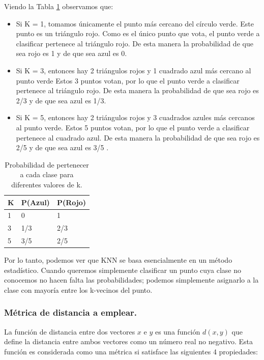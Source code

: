\documentclass[12pt,a4paper]{article}
\begin{document}
\begin{sloppypar}
Viendo la Tabla \ref{table:2} observamos que:

\begin{itemize}
\item Si K = 1, tomamos únicamente el punto más cercano del círculo verde. Este punto es un triángulo rojo. Como es el único punto que vota, el punto verde a clasificar pertenece al triángulo rojo. De esta manera la probabilidad de que sea rojo es 1 y de que sea azul es 0.
\item Si K = 3, entonces hay 2 triángulos rojos y 1 cuadrado azul más cercano al punto verde Estos 3 puntos votan, por lo que el punto verde a clasificar pertenece al triángulo rojo. De esta manera la probabilidad de que sea rojo es 2/3  y de que sea azul es 1/3.
\item Si K = 5, entonces hay 2 triángulos rojos y 3 cuadrados azules más cercanos al punto verde. Estos 5 puntos votan, por lo que el punto verde a clasificar pertenece al cuadrado azul. De esta manera la probabilidad de que sea rojo es 2/5 y de que sea azul es 3/5 .
\end{itemize}

\begin{table}[h!]
\centering
\begin{tabular}{|p{2cm}|p{2cm}|p{2cm}|}
\hline
\textbf{K} & \textbf{P(Azul)} & \textbf{P(Rojo)} \\ [1ex] 
\hline
1 & 0 & 1 \\
\hline
3 & 1/3 & 2/3 \\
\hline
5 & 3/5 & 2/5 \\ [1ex] 
\hline
\end{tabular}
\caption{Probabilidad de pertenecer a cada clase para diferentes valores de k.}
\label{table:2}
\end{table}

Por lo tanto, podemos ver que KNN se basa esencialmente en un método estadístico. Cuando queremos simplemente clasificar un punto cuya clase no conocemos no hacen falta las probabilidades; podemos simplemente asignarlo a la clase con mayoría entre los k-vecinos del punto.\\

\subsubsection{Métrica de distancia a emplear.}

La función de distancia entre dos vectores $x$ e $y$ es una función $d(x,y)$ que define la distancia entre ambos vectores como un número real no negativo. Esta función es considerada como una métrica si satisface las siguientes 4 propiedades\cite{KNN_Ejemplo}: 


\end{sloppypar}
\end{document}
